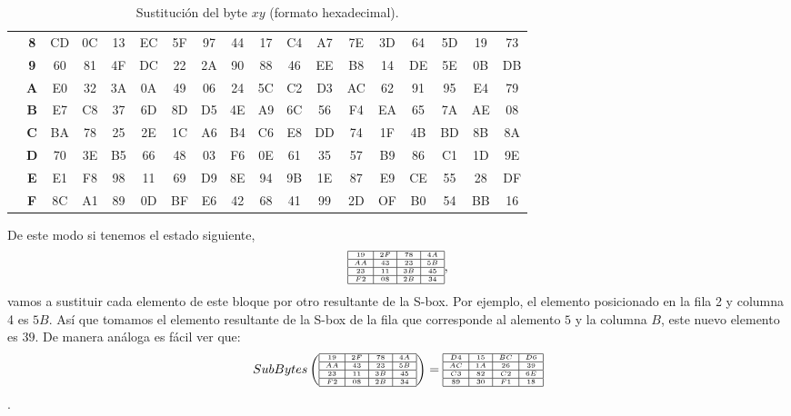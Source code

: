\begin{enumerate}
\begin{table}[ht!]
\begin{center}
{\begin{tabular}{|c|c|c|c|c|c|c|c|c|c|c|c|c|c|c|c|c|c|}
                    & {\textbf 8} & CD & 0C & 13 & EC & 5F & 97 & 44 & 17 & C4 & A7 & 7E & 3D & 64 & 5D & 19 & 73 \\
                    & {\textbf 9} & 60 & 81 & 4F & DC & 22 & 2A & 90 & 88 & 46 & EE & B8 & 14 & DE & 5E & 0B & DB \\
                    & {\textbf A} & E0 & 32 & 3A & 0A & 49 & 06 & 24 & 5C & C2 & D3 & AC & 62 & 91 & 95 & E4 & 79 \\
                    & {\textbf B} & E7 & C8 & 37 & 6D & 8D & D5 & 4E & A9 & 6C & 56 & F4 & EA & 65 & 7A & AE & 08 \\
                    & {\textbf C} & BA & 78 & 25 & 2E & 1C & A6 & B4 & C6 & E8 & DD & 74 & 1F & 4B & BD & 8B & 8A \\
                    & {\textbf D} & 70 & 3E & B5 & 66 & 48 & 03 & F6 & 0E & 61 & 35 & 57 & B9 & 86 & C1 & 1D & 9E \\
                    & {\textbf E} & E1 & F8 & 98 & 11 & 69 & D9 & 8E & 94 & 9B & 1E & 87 & E9 & CE & 55 & 28 & DF \\
                    & {\textbf F} & 8C & A1 & 89 & 0D & BF & E6 & 42 & 68 & 41 & 99 & 2D & OF & B0 & 54 & BB & 16 \\
                      \hline
\end{tabular}
}
\end{center}\caption{Sustitución del byte $xy$ (formato hexadecimal).}
\end{table}

De este modo si tenemos el estado siguiente,
$$\tiny{
\begin{array}{|c|c|c|c|}
\hline
19 & 2F & 78 & 4A\\\hline
AA & 43 & 23 & 5B\\\hline
23 & 11 & 3B & 45\\\hline
F2 & 08 & 2B & 34\\\hline
\end{array},
}$$ vamos a sustituir cada elemento de este bloque por otro resultante de la S-box. Por ejemplo, el elemento posicionado en la fila 2 y columna 4 es  $5B$. Así que tomamos el elemento resultante de la S-box de la fila que corresponde al alemento $5$ y la columna $B$, este nuevo elemento es $39$. De manera análoga es fácil ver que:\\

$$SubBytes\left(\tiny{
\begin{array}{|c|c|c|c|}
\hline
19 & 2F & 78 & 4A\\\hline
AA & 43 & 23 & 5B\\\hline
23 & 11 & 3B & 45\\\hline
F2 & 08 & 2B & 34\\\hline
\end{array}
}
\right)=\tiny{
\begin{array}{|c|c|c|c|}
\hline
D4 & 15 & BC & D6\\\hline
AC & 1A & 26 & 39\\\hline
C3 & 82 & C2 & 6E\\\hline
89 & 30 & F1 & 18\\\hline
\end{array}
}$$.



\end{enumerate}
